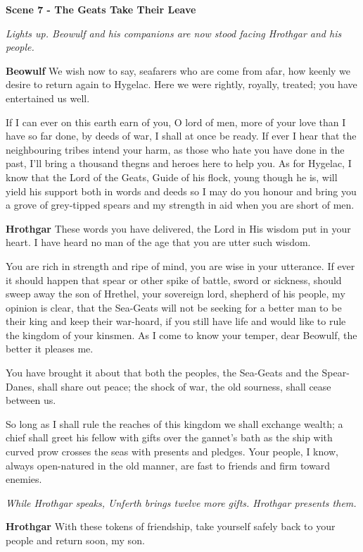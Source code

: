 \documentclass[a4paper]{article}
\begin{document}
{\newpage
\centerline{\textbf{Scene 7 - The Geats Take Their Leave}}
\centerline{\textit{Lights up. Beowulf and his companions are now stood facing Hrothgar and his people.}}

\textbf{Beowulf} We wish now to say, seafarers who
are come from afar, how keenly we desire
to return again to Hygelac. Here we were rightly,
royally, treated; you have entertained us well.

If I can ever on this earth earn of you,
O lord of men, more of your love
than I have so far done, by deeds of war,
I shall at once be ready. If ever I hear
that the neighbouring tribes intend your harm,
as those who hate you have done in the past,
I'll bring a thousand thegns and heroes
here to help you. As for Hygelac, I know
that the Lord of the Geats, Guide of his flock,
young though he is, will yield his support
both in words and deeds so I may do you honour
and bring you a grove of grey-tipped spears
and my strength in aid when you are short of men.

\textbf{Hrothgar} These words you have delivered, the Lord in His wisdom
put in your heart. I have heard no man
of the age that you are utter such wisdom.

You are rich in strength and ripe of mind,
you are wise in your utterance. If ever it should happen
that spear or other spike of battle,
sword or sickness, should sweep away
the son of Hrethel, your sovereign lord,
shepherd of his people, my opinion is clear,
that the Sea-Geats will not be seeking for a better
man to be their king and keep their war-hoard,
if you still have life and would like to rule
the kingdom of your kinsmen. As I come to know
your temper, dear Beowulf, the better it pleases me.

You have brought it about that both the peoples,
the Sea-Geats and the Spear-Danes,
shall share out peace; the shock of war,
the old sourness, shall cease between us.

So long as I shall rule the reaches of this kingdom
we shall exchange wealth; a chief shall greet
his fellow with gifts over the gannet's bath
as the ship with curved prow crosses the seas
with presents and pledges. Your people, I know,
always open-natured in the old manner,
are fast to friends and firm toward enemies.

\centerline{\textit{While Hrothgar speaks, Unferth brings twelve more gifts. Hrothgar presents them.}}

\textbf{Hrothgar} With these tokens of friendship,
take yourself safely back to your people
and return soon, my son.

}
\end{document}
